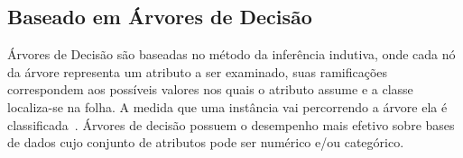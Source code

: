 


    
    \subsection{Baseado em Árvores de Decisão}
        \label{subsec:decisive-tree}
        Árvores de Decisão são baseadas no método da inferência indutiva, onde cada nó da árvore representa um atributo a ser examinado, suas ramificações correspondem aos possíveis valores nos quais o atributo assume e a classe localiza\hyp{se} na folha. A medida que uma instância vai percorrendo a árvore ela é classificada~\cite{mitchell1997machine, quinlan1986induction}. Árvores de decisão possuem o desempenho mais efetivo sobre bases de dados cujo conjunto de atributos pode ser numérico e/ou categórico.

